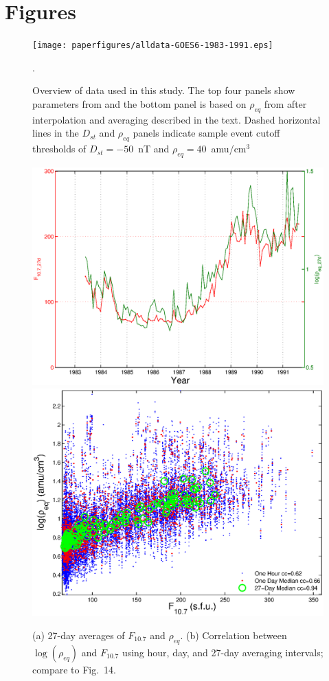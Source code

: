 \documentclass[10pt,twocolumn]{article}
\begin{document}
\newpage
\footnotesize



\clearpage
\section{Figures}

\begin{figure}[htp!]
\centering
\texttt{[image: paperfigures/alldata-GOES6-1983-1991.eps]}
\caption{Overview of data used in this study. The top four panels show parameters from \cite{Reconstruction} and the bottom panel is based on $\rho_{eq}$ from \cite{Denton} after interpolation and averaging described in the text. Dashed horizontal lines in the $D_{st}$ and $\rho_{eq}$ panels indicate sample event cutoff thresholds of $D_{st}=-50$~nT and $\rho_{eq}=40$~amu/cm$^3$}.
\label{AllData}
\end{figure}

\begin{figure}[htp!]
\centering
\includegraphics[scale=0.40]{paperfigures/F107MDAllData.eps}
\includegraphics[scale=0.40]{paperfigures/ccplot.eps}
\caption{(a) 27-day averages of $F_{10.7}$ and $\rho_{eq}$. (b) Correlation between $\log(\rho_{eq})$ and $F_{10.7}$ using hour, day, and 27-day averaging intervals; compare to \cite{Takahashi2010} Fig.~14.}
\label{ccplot}
\end{figure}
\clearpage
\end{document}
